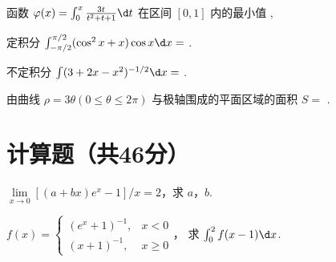 \documentclass[quiet]{ctexart}
\begin{document}
\begin{problem}
  函数 $\varphi(x) = \int_0^x \frac{3t}{t^2 + t + 1} \d t$
  在区间 $[0,1]$ 内的最小值 ,
\end{problem}
\begin{solution}
  
\end{solution}

\begin{problem}
  定积分 $\int_{-\pi/2}^{\pi/2} (\cos^2 x + x) \cos x \d x = $ .
\end{problem}
\begin{solution}
  
\end{solution}

\begin{problem}
  不定积分 $\int (3 + 2x - x^2)^{-1/2} \d x = $ .
\end{problem}
\begin{solution}
  
\end{solution}

\begin{problem}
  由曲线 $\rho = 3\theta (0 \leq \theta \leq 2\pi)$
  与极轴围成的平面区域的面积 $S = $ .
\end{problem}
\begin{solution}
  
\end{solution}

\section{计算题（共46分）}

\begin{problem}[本题?分]
  $\lim\limits_{x \to 0} [(a + bx)e^x - 1]/x = 2$，求 $a$，$b$.
\end{problem}
\begin{solution}
  
\end{solution}

\begin{problem}
  $ f(x) =
    \begin{cases}
      (e^x + 1)^{-1}, & x < 0\\
      (x + 1)^{-1},   & x \geq 0
    \end{cases}$，
  求 $\int_0^2 f(x - 1) \d x$.
\end{problem}
\begin{solution}
  
\end{solution}
\end{document}
